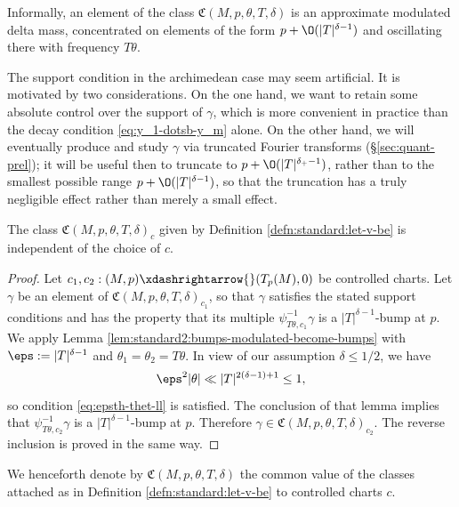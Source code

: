 \begin{remark}\label{remark:crb2bpyvfj}
  Informally, an element of the class $\mathfrak{C}(M,p,\theta,T,\delta)$ is an approximate modulated delta mass, concentrated on elements of the form $p + \O(|T|^{\delta-1})$ and oscillating there with frequency $T \theta$.

  The support condition in the archimedean case may seem artificial.  It is motivated by two considerations.  On the one hand, we want to retain some absolute control over the support of $\gamma$, which is more convenient in practice than the decay condition \eqref{eq:y_1-dotsb-y_m} alone.  On the other hand, we will eventually produce and study $\gamma$  via truncated Fourier transforms (\S\ref{sec:quant-prel}); it will be useful then to truncate to $p + \O(|T|^{\delta_+-1})$, rather than to the smallest possible range $p + \O(|T|^{\delta-1})$, so that the truncation has a truly negligible effect rather than merely a small effect.
\end{remark}

\begin{proposition}\label{lem:standard2:class-mathfrakcm-p}
  The class $\mathfrak{C}(M,p,\theta,T,\delta)_c$ given by Definition \ref{defn:standard:let-v-be} is independent of the choice of $c$.
\end{proposition}
\begin{proof}
  Let $c_1, c_2 : (M, p) \xdashrightarrow{} (T_p(M),0)$ be controlled charts.  Let $\gamma$ be an element of $\mathfrak{C}(M,p,\theta,T,\delta)_{c_1}$, so that $\gamma$ satisfies the stated support conditions and has the property that its multiple $\psi_{T \theta,c_1}^{-1} \gamma$ is a $|T|^{\delta-1}$-bump at $p$.  We apply Lemma \ref{lem:standard2:bumps-modulated-become-bumps} with $\eps := |T|^{\delta-1}$ and $\theta_1 = \theta_2 = T \theta$.  In view of our assumption $\delta \leq 1/2$, we have
  \begin{equation*}
    \eps^2 |\theta|  \ll |T|^{2 (\delta - 1) + 1} \leq 1,
  \end{equation*}
  so condition \ref{eq:epsth-thet-ll} is satisfied.  The conclusion of that lemma implies that $\psi_{T \theta, c_2}^{-1} \gamma$ is a $|T|^{\delta-1}$-bump at $p$.  Therefore $\gamma \in \mathfrak{C}(M,p,\theta,T,\delta)_{c_2}$.  The reverse inclusion is proved in the same way.
\end{proof}

\begin{definition}\label{defn:we-henceforth-denote}
  We henceforth denote by $\mathfrak{C}(M,p,\theta,T,\delta)$ the common value of the classes attached as in Definition \ref{defn:standard:let-v-be} to controlled charts $c$.
\end{definition}

